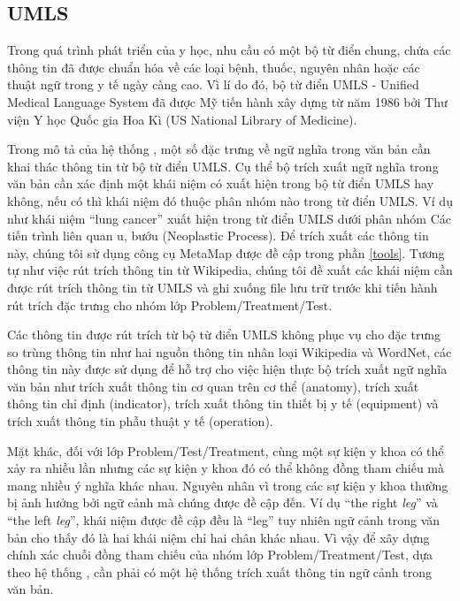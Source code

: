 \subsection*{UMLS}
Trong quá trình phát triển của y học, nhu cầu có một bộ từ điển chung, chứa các thông tin đã được chuẩn hóa về các loại bệnh, thuốc, nguyên nhân hoặc các thuật ngữ trong y tế ngày càng cao. Vì lí do đó, bộ từ điển UMLS - Unified Medical Language System đã được Mỹ tiến hành xây dựng từ năm 1986 bởi Thư viện Y học Quốc gia Hoa Kì (US National Library of Medicine).

Trong mô tả của hệ thống \cite{YanXu2012}, một số đặc trưng về ngữ nghĩa trong văn bản cần khai thác thông tin từ bộ từ điển UMLS. Cụ thể bộ trích xuất ngữ nghĩa trong văn bản cần xác định một khái niệm có xuất hiện trong bộ từ điển UMLS hay không, nếu có thì khái niệm đó thuộc phân nhóm nào trong từ điển UMLS. Ví dụ như khái niệm ``lung cancer'' xuất hiện trong từ điển UMLS dưới phân nhóm Các tiến trình liên quan u, bướu (Neoplastic Process). Để trích xuất các thông tin này, chúng tôi sử dụng công cụ MetaMap được đề cập trong phần \ref{tools}. Tương tự như việc rút trích thông tin từ Wikipedia, chúng tôi đề xuất các khái niệm cần được rút trích thông tin từ UMLS và ghi xuống file lưu trữ trước khi tiến hành rút trích đặc trưng cho nhóm lớp Problem/Treatment/Test.

Các thông tin được rút trích từ bộ từ điển UMLS không phục vụ cho đặc trưng so trùng thông tin như hai nguồn thông tin nhân loại Wikipedia và WordNet, các thông tin này được sử dụng để hỗ trợ cho việc hiện thực bộ trích xuất ngữ nghĩa văn bản như trích xuất thông tin cơ quan trên cơ thể (anatomy), trích xuất thông tin chỉ định (indicator), trích xuất thông tin thiết bị y tế (equipment) và trích xuất thông tin phẫu thuật y tế (operation).

Mặt khác, đối với lớp Problem/Test/Treatment, cùng một sự kiện y khoa có thể xảy ra nhiều lần nhưng các sự kiện y khoa đó có thể không đồng tham chiếu mà mang nhiều ý nghĩa khác nhau. Nguyên nhân vì trong các sự kiện y khoa thường bị ảnh hưởng bởi ngữ cảnh mà chúng được đề cập đến. Ví dụ ``the right \textit{leg}'' và ``the left \textit{leg}'', khái niệm được đề cập đều là ``leg'' tuy nhiên ngữ cảnh trong văn bản cho thấy đó là hai khái niệm chỉ hai chân khác nhau. Vì vậy để xây dựng chính xác chuỗi đồng tham chiếu của nhóm lớp Problem/Treatment/Test, dựa theo hệ thống \cite{YanXu2012}, cần phải có một hệ thống trích xuất thông tin ngữ cảnh trong văn bản.

